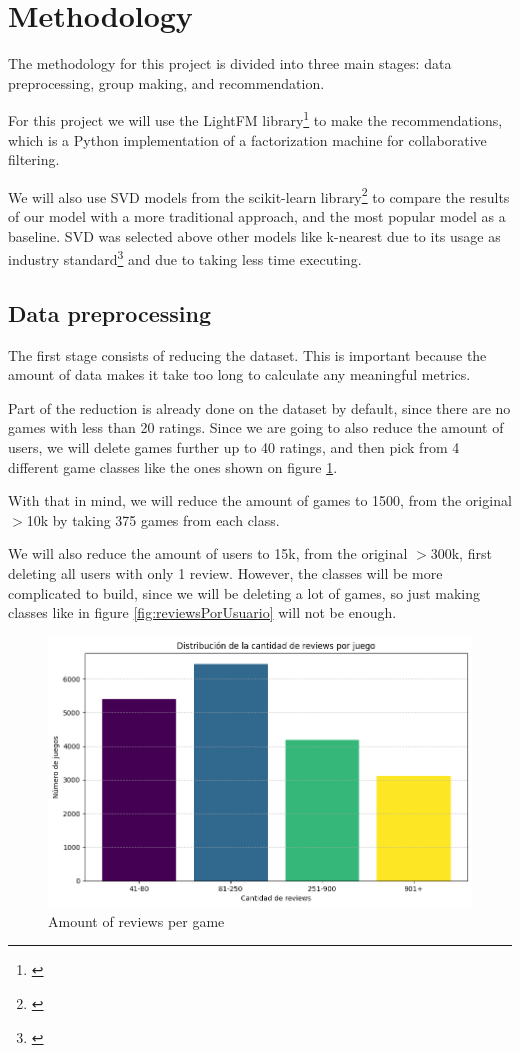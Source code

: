 \documentclass{article}
\begin{document}
\section{Methodology}

The methodology for this project is divided into three main stages: data preprocessing, group making, and recommendation.

For this project we will use the LightFM library\footnote{\cite{DBLP:conf/recsys/Kula15}} to make the recommendations, which is a Python implementation of a factorization machine for collaborative filtering.

We will also use SVD models from the scikit-learn library\footnote{\cite{scikit-learn}} to compare the results of our model with a more traditional approach, and the most popular model as a baseline. SVD was selected above other models like k-nearest due to its usage as industry standard\footnote{\cite{Roy2022}} and due to taking less time executing.

\subsection{Data preprocessing}
The first stage consists of reducing the dataset. This is important because the amount of data makes it take too long to calculate any meaningful metrics.

Part of the reduction is already done on the dataset by default, since there are no games with less than 20 ratings. Since we are going to also reduce the amount of users, we will delete games further up to 40 ratings, and then pick from 4 different game classes like the ones shown on figure \ref{fig:reviewsPorJuego}.

With that in mind, we will reduce the amount of games to 1500, from the original $>$10k by taking 375 games from each class.

We will also reduce the amount of users to 15k, from the original $>$300k, first deleting all users with only 1 review. However, the classes will be more complicated to build, since we will be deleting a lot of games, so just making classes like in figure \ref{fig:reviewsPorUsuario} will not be enough.

\begin{figure}[h]
    \centering
    \includegraphics[width=0.8\linewidth]{ReviewsPorJuego.png}
    \caption{Amount of reviews per game}
    \label{fig:reviewsPorJuego}
\end{figure}
\end{document}
